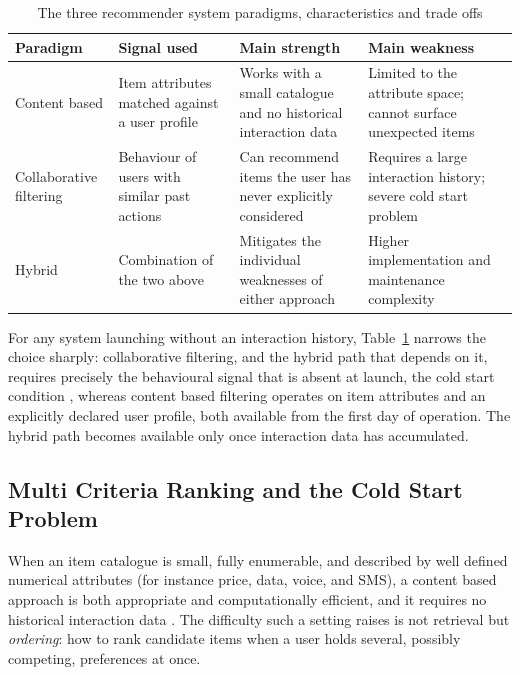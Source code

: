 \begin{table}[H]
  \caption{The three recommender system paradigms, characteristics and trade offs}
  \label{tab:recsys-paradigms}
  \centering\small
  \begin{tabular}{|p{2.8cm}|p{3.6cm}|p{3.6cm}|p{3.8cm}|}
    \hline
    \textbf{Paradigm} & \textbf{Signal used} & \textbf{Main strength} & \textbf{Main weakness} \\
    \hline
    Content based & Item attributes matched against a user profile & Works with a small catalogue and no historical interaction data & Limited to the attribute space; cannot surface unexpected items \\
    \hline
    Collaborative filtering & Behaviour of users with similar past actions & Can recommend items the user has never explicitly considered & Requires a large interaction history; severe cold start problem \\
    \hline
    Hybrid & Combination of the two above & Mitigates the individual weaknesses of either approach & Higher implementation and maintenance complexity \\
    \hline
  \end{tabular}
\end{table}

For any system launching without an interaction history, Table~\ref{tab:recsys-paradigms} narrows the choice sharply: collaborative filtering, and the hybrid path that depends on it, requires precisely the behavioural signal that is absent at launch, the cold start condition \parencite{AdomaviciusTuzhilin2005, hu2008collaborative}, whereas content based filtering operates on item attributes and an explicitly declared user profile, both available from the first day of operation. The hybrid path becomes available only once interaction data has accumulated.

\subsection{Multi Criteria Ranking and the Cold Start Problem}

When an item catalogue is small, fully enumerable, and described by well defined numerical attributes (for instance price, data, voice, and SMS), a content based approach is both appropriate and computationally efficient, and it requires no historical interaction data \parencite{Geron2022, LopsGemmisSemeraro2011}. The difficulty such a setting raises is not retrieval but \emph{ordering}: how to rank candidate items when a user holds several, possibly competing, preferences at once.

